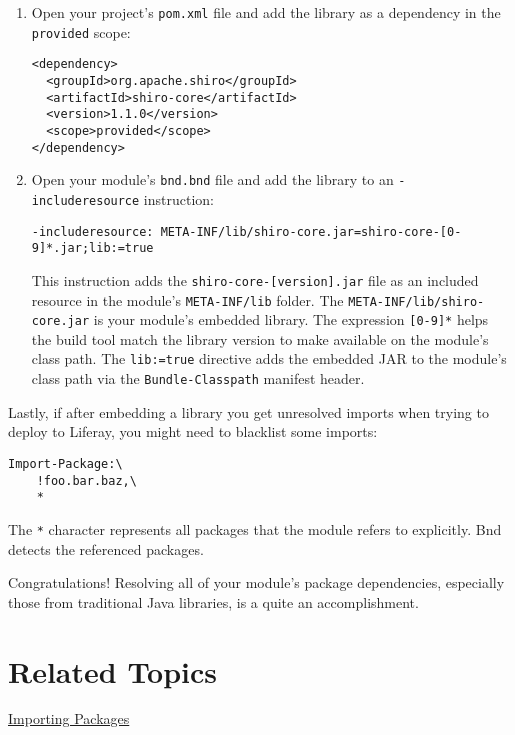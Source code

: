 \begin{enumerate}
\def\labelenumi{\arabic{enumi}.}
\item
  Open your project's \texttt{pom.xml} file and add the library as a
  dependency in the \texttt{provided} scope:

\begin{verbatim}
<dependency>
  <groupId>org.apache.shiro</groupId>
  <artifactId>shiro-core</artifactId>
  <version>1.1.0</version>
  <scope>provided</scope>
</dependency>
\end{verbatim}
\item
  Open your module's \texttt{bnd.bnd} file and add the library to an
  \texttt{-includeresource} instruction:

\begin{verbatim}
-includeresource: META-INF/lib/shiro-core.jar=shiro-core-[0-9]*.jar;lib:=true
\end{verbatim}

  This instruction adds the \texttt{shiro-core-{[}version{]}.jar} file
  as an included resource in the module's \texttt{META-INF/lib} folder.
  The \texttt{META-INF/lib/shiro-core.jar} is your module's embedded
  library. The expression \texttt{{[}0-9{]}*} helps the build tool match
  the library version to make available on the module's class path. The
  \texttt{lib:=true} directive adds the embedded JAR to the module's
  class path via the \texttt{Bundle-Classpath} manifest header.
\end{enumerate}

Lastly, if after embedding a library you get unresolved imports when
trying to deploy to Liferay, you might need to blacklist some imports:

\begin{verbatim}
Import-Package:\
    !foo.bar.baz,\
    *
\end{verbatim}

The \texttt{*} character represents all packages that the module refers
to explicitly. Bnd detects the referenced packages.

Congratulations! Resolving all of your module's package dependencies,
especially those from traditional Java libraries, is a quite an
accomplishment.

\section{Related Topics}\label{related-topics-2}

\href{/docs/7-2/customization/-/knowledge_base/c/importing-packages}{Importing
Packages}

